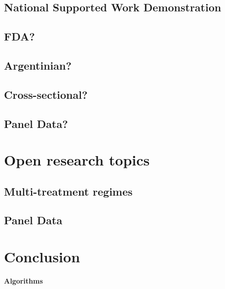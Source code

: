 \documentclass[11pt,titlepage]{article}
\begin{document}
\subsection{National Supported Work Demonstration}
\subsection{FDA?}
\subsection{Argentinian?}
\subsection{Cross-sectional?}
\subsection{Panel Data?}
                                                                                                                                                             
 
\section{Open research topics}
\subsection{Multi-treatment regimes}
\subsection{Panel Data}
                                                                                                                                                             
\section{Conclusion}


\appendix
\paragraph{Algorithms}
\end{document}
